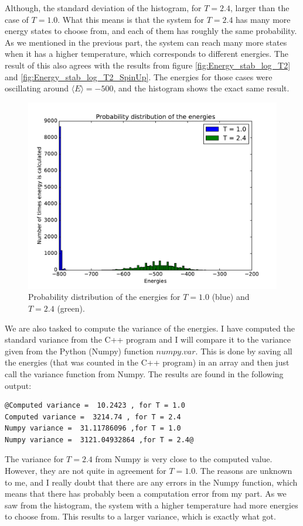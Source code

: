\documentclass[12pt]{article}
\begin{document}
Although, the standard deviation of the histogram, for $T=2.4$, larger than the case of $T=1.0$. What this means is that the system for $T=2.4$ has many more energy states to choose from, and each of them has roughly the same probability. As we mentioned in the previous part, the system can reach many more states when it has a higher temperature, which corresponds to different energies. The result of this also agrees with the results from figure \ref{fig:Energy_stab_log_T2} and \ref{fig:Energy_stab_log_T2_SpinUp}. The energies for those cases were oscillating around $\langle E \rangle = -500$, and the histogram shows the exact same result.
\begin{figure}[H]
\centering
\includegraphics[width=\linewidth]{Plots/Probability_distribution_merged.pdf}
\caption{Probability distribution of the energies for $T=1.0$ (blue) and $T=2.4$ (green).}
\label{fig:prob_dist_merged}
\end{figure}
We are also tasked to compute the variance of the energies. I have computed the standard variance from the C++ program and I will compare it to the variance given from the Python (Numpy) function $numpy.var$. This is done by saving all the energies (that was counted in the C++ program) in an array and then just call the variance function from Numpy. The results are found in the following output:
\begin{lstlisting}
@Computed variance =  10.2423 , for T = 1.0
Computed variance =  3214.74 , for T = 2.4
Numpy variance =  31.11786096 ,for T = 1.0
Numpy variance =  3121.04932864 ,for T = 2.4@
\end{lstlisting}
The variance for $T=2.4$ from Numpy is very close to the computed value. However, they are not quite in agreement for $T=1.0$. The reasons are unknown to me, and I really doubt that there are any errors in the Numpy function, which means that there has probably been a computation error from my part. As we saw from the histogram, the system with a higher temperature had more energies to choose from. This results to a larger variance, which is exactly what got.
\FloatBarrier
\end{document}
